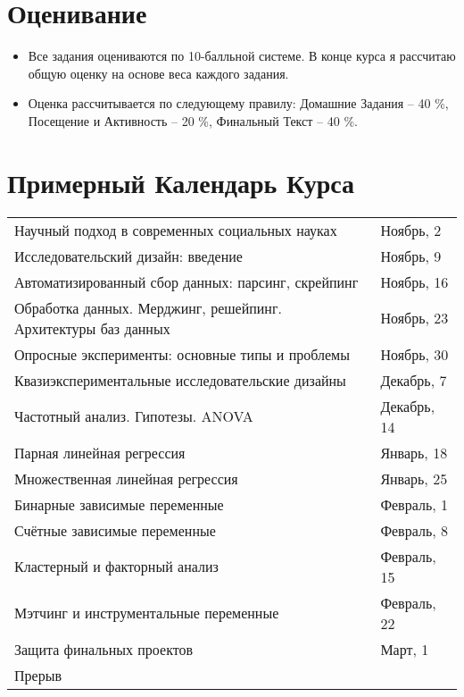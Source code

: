 \documentclass[12pt]{article}
\begin{document}
\section*{Оценивание}
\begin{itemize}
\item Все задания оцениваются по 10-балльной системе. В конце курса я рассчитаю общую оценку на основе веса каждого задания.
\item Оценка рассчитывается по следующему правилу: Домашние Задания -- 40 \%,  Посещение и Активность -- 20 \%,  Финальный Текст -- 40 \%.  
\end{itemize}
\section*{Примерный Календарь Курса}
\begin{table}[H]
\begin{tabular}{p{}@{}p{}@{}}
Научный подход в современных социальных науках \dotfill & Ноябрь, 2 \\ 
Исследовательский дизайн: введение \dotfill & Ноябрь, 9 \\
Автоматизированный сбор данных: парсинг, скрейпинг \dotfill & Ноябрь, 16 \\
Обработка данных. Мерджинг, решейпинг. Архитектуры баз данных \dotfill & Ноябрь, 23 \\
Опросные эксперименты: основные типы и проблемы \dotfill & Ноябрь, 30 \\
Квазиэкспериментальные исследовательские дизайны \dotfill & Декабрь, 7 \\
Частотный анализ. Гипотезы. ANOVA \dotfill & Декабрь, 14 \\
Парная линейная регрессия  \dotfill & Январь, 18 \\
Множественная линейная регрессия \dotfill & Январь, 25 \\
Бинарные зависимые переменные \dotfill & Февраль, 1 \\
Счётные зависимые переменные \dotfill & Февраль, 8 \\
Кластерный и факторный анализ \dotfill & Февраль, 15 \\
Мэтчинг и инструментальные переменные \dotfill & Февраль, 22 \\
Защита финальных проектов \dotfill & Март, 1 \\

Прерыв \dotfill \\






\end{tabular}
\end{table}
\end{document}
